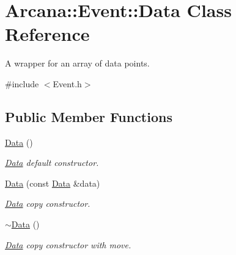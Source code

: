 \hypertarget{class_arcana_1_1_event_1_1_data}{}\section{Arcana\+:\+:Event\+:\+:Data Class Reference}
\label{class_arcana_1_1_event_1_1_data}


A wrapper for an array of data points.  




{\ttfamily \#include $<$Event.\+h$>$}

\subsection*{Public Member Functions}
\begin{DoxyCompactItemize}
\item 
\mbox{\label{class_arcana_1_1_event_1_1_data_a4f6353ff86d50c6cfd1bfc66707497a5}} 
\mbox{\hyperlink{class_arcana_1_1_event_1_1_data_a4f6353ff86d50c6cfd1bfc66707497a5}{Data}} ()
\begin{DoxyCompactList}\small\item\em \mbox{\hyperlink{class_arcana_1_1_event_1_1_data}{Data}} default constructor. \end{DoxyCompactList}\item 
\mbox{\label{class_arcana_1_1_event_1_1_data_a85fb04eff347926ff422bd4101969224}} 
\mbox{\hyperlink{class_arcana_1_1_event_1_1_data_a85fb04eff347926ff422bd4101969224}{Data}} (const \mbox{\hyperlink{class_arcana_1_1_event_1_1_data}{Data}} \&data)
\begin{DoxyCompactList}\small\item\em \mbox{\hyperlink{class_arcana_1_1_event_1_1_data}{Data}} copy constructor. \end{DoxyCompactList}\item 
\mbox{\hyperlink{class_arcana_1_1_event_1_1_data_a8076fa1e15aa67b9df4c8970bb92d2b9}{$\sim$\+Data}} ()
\begin{DoxyCompactList}\small\item\em \mbox{\hyperlink{class_arcana_1_1_event_1_1_data}{Data}} copy constructor with move. \end{DoxyCompactList}\item 
\mbox{\label{class_arcana_1_1_event_1_1_data_a5ad2885d6ad41e64b51e6729331be939}} 

\end{DoxyCompactItemize}
